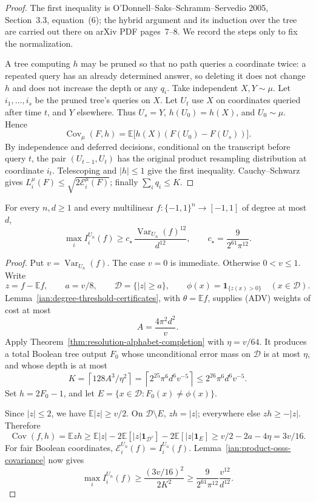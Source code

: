 \begin{proof}
The first inequality is O'Donnell--Saks--Schramm--Servedio 2005,
Section~3.3, equation~(6); the hybrid argument and its induction
over the tree are carried out there on arXiv PDF pages~7--8. We
record the steps only to fix the normalization.

A tree computing \(h\) may be pruned so that no path queries a
coordinate twice: a repeated query has an already determined answer,
so deleting it does not change \(h\) and does not increase the depth
or any \(q_i\). Take independent \(X,Y\sim\mu\). Let
\(i_1,\ldots,i_s\) be the pruned tree's queries on \(X\). Let \(U_t\)
use \(X\) on coordinates queried after time \(t\), and \(Y\)
elsewhere. Thus \(U_s=Y\), \(h(U_0)=h(X)\), and \(U_0\sim\mu\). Hence
\[
 \operatorname{Cov}_\mu(F,h)
 =\mathbb E\bigl[h(X)(F(U_0)-F(U_s))\bigr].
\]
By independence and deferred decisions, conditional on the transcript
before query \(t\), the pair \((U_{t-1},U_t)\) has the original
product resampling distribution at coordinate \(i_t\).
Telescoping and \(|h|\le1\) give the first inequality.
Cauchy--Schwarz gives \(L_i^\mu(F)\le\sqrt{2\mathcal E_i^\mu(F)}\);
finally \(\sum_iq_i\le K\).
\end{proof}

\begin{theorem}
\label{ian:uniform-influence-aa-proved}
For every \(n,d\ge1\) and every multilinear
\(f:\{-1,1\}^n\to[-1,1]\) of degree at most \(d\),
\[
 \max_i I_i^{U_n}(f)
 \ge c_\star\,
       \frac{\operatorname{Var}_{U_n}(f)^{12}}{d^{12}},
 \qquad c_\star=\frac{9}{2^{61}\pi^{12}}.
 \tag{I-AA}
\]
\end{theorem}

\begin{proof}
Put \(v=\operatorname{Var}_{U_n}(f)\). The case \(v=0\) is immediate.
Otherwise \(0<v\le1\). Write
\[
 z=f-\mathbb Ef,\qquad
 a=v/8,\qquad
 \mathcal D=\{|z|\ge a\},\qquad
 \phi(x)=\mathbf1_{\{z(x)>0\}}\quad(x\in\mathcal D).
\]
Lemma~\ref{ian:degree-threshold-certificates}, with
\(\theta=\mathbb Ef\), supplies (ADV) weights of cost at most
\[
 A=\frac{4\pi^2d^2}{v}.
\]
Apply Theorem~\ref{thm:resolution-alphabet-completion} with
\(\eta=v/64\). It produces a total Boolean tree output \(F_0\)
whose unconditional error mass on \(\mathcal D\) is at most
\(\eta\), and whose depth is at most
\[
 K=\left\lceil128A^3/\eta^2\right\rceil
  =\left\lceil2^{25}\pi^6d^6v^{-5}\right\rceil
  \le2^{26}\pi^6d^6v^{-5}.
\]
Set \(h=2F_0-1\), and let
\(E=\{x\in\mathcal D:F_0(x)\ne\phi(x)\}\).

Since \(|z|\le2\), we have \(\mathbb E|z|\ge v/2\).
On \(\mathcal D\setminus E\), \(zh=|z|\); everywhere else
\(zh\ge-|z|\). Therefore
\[
 \operatorname{Cov}(f,h)=\mathbb Ezh
 \ge\mathbb E|z|-2\mathbb E[|z|\mathbf1_{\mathcal D^c}]
                     -2\mathbb E[|z|\mathbf1_E]
 \ge v/2-2a-4\eta
 =3v/16.
\]
For fair Boolean coordinates,
\(\mathcal E_i^{U_n}(f)=I_i^{U_n}(f)\).
Lemma~\ref{ian:product-osss-covariance} now gives
\[
 \max_i I_i^{U_n}(f)
 \ge\frac{(3v/16)^2}{2K^2}
 \ge\frac{9}{2^{61}\pi^{12}}\frac{v^{12}}{d^{12}}.
\]
\end{proof}

